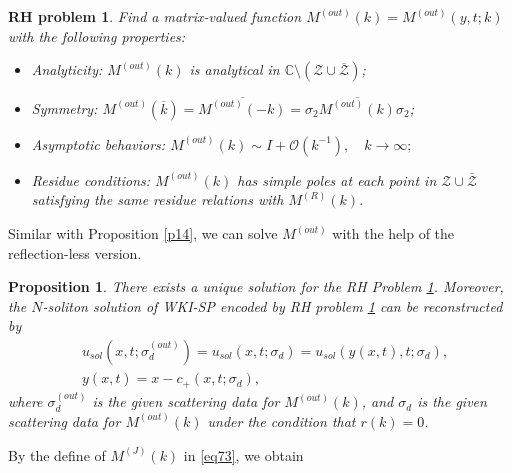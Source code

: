 \documentclass[11pt]{article}
\numberwithin{equation}{section}
\newtheorem{Proposition}{Proposition}
\newtheorem{RHP}{RH problem}
\begin{document}
\begin{RHP}\label{rhp30}
 Find a matrix-valued function $M^{(out)}(k) = M^{(out)}(y, t;k)$ with the following properties:

\begin{itemize}
    \item Analyticity: $M^{(out)}(k)$ is analytical in $\mathbb{C} \setminus (\mathcal{Z} \cup \overline{\mathcal{Z}})$;
    \item Symmetry: $M^{(out)}(\overline{k}) = \overline{M^{(out)}(-k)} = \sigma_2 \overline{M^{(out)}(k) }\sigma_2$;
    \item Asymptotic behaviors: $M^{(out)}(k) \sim I + \mathcal{O}(k^{-1}), \quad k \to \infty; $
    \item Residue conditions: $M^{(out)}(k)$ has simple poles at each point in $\mathcal{Z} \cup \overline{\mathcal{Z}}$ satisfying the same residue relations  with $M^{(R)}(k)$.
\end{itemize}
\end{RHP}

Similar with Proposition \ref{p14}, we can solve $M^{(out)}$ with the help of the reflection-less version.

\begin{Proposition}\label{p31}
    There exists a unique solution for the RH Problem \ref{rhp30}. Moreover, the $N$-soliton solution of WKI-SP encoded by RH problem \ref{rhp30} can be reconstructed by
\begin{align*}
    &u_{sol}(x, t;\sigma_d^{(out)})=u_{sol}(x, t;\sigma_d)=u_{sol}(y(x,t), t;\sigma_d),\\
    &y(x,t)=x-c_+(x,t;\sigma_d),
\end{align*}
where $\sigma_d^{(out)}$ is the given scattering data for $M^{(out)}(k)$, and $\sigma_d$ is the given scattering data for $M^{(out)}(k)$ under the condition that $r(k)=0$.
\end{Proposition}

By the define of $M^{(J)}(k)$ in \eqref{eq73}, we obtain
\end{document}
